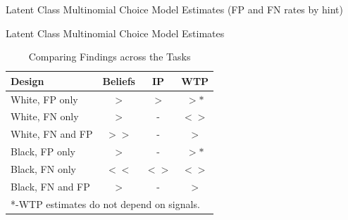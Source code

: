\documentclass[11pt,a4paper]{article}
\begin{document}
\newpage

\begin{table}[H]
\caption{Latent Class Multinomial Choice Model Estimates (FP and FN rates by hint)}

\end{table}







\newpage
%

\begin{table}[H]
\caption{Latent Class Multinomial Choice Model Estimates}

\end{table}

%

%



%


%



\begin{table}[H]\centering
\caption{Comparing Findings across the Tasks}
\begin{tabular}{l|c|c|c}
\hline \hline
Design & Beliefs & IP &WTP\\
\hline
White, FP only & $>$ & $>$ & $>*$ \\
White, FN only & $>$ & - & $<>$ \\
White, FN and FP & $>>$ & - & $>$ \\
Black, FP only & $>$ & - & $>*$ \\
Black, FN only & $<<$ & $<>$ & $<>$ \\
Black, FN and FP & $>$ & - & $>$\\
\hline
\multicolumn{4}{l}{*-WTP estimates do not depend on signals.}\\
\end{tabular}
\end{table}
\end{document}
